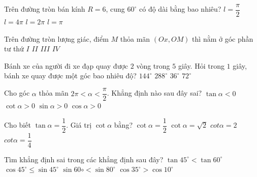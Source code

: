 \begin{ex}%
Trên đường tròn bán kính $R=6$, cung $60^\circ$  có độ dài bằng bao nhiêu?
	\choice
	{\True $l=\dfrac{\pi}{2}$}
	{$l=4\pi$}
	{$l=2\pi$}
	{$l=\pi$}
\end{ex}
\begin{ex}%
	Trên đường tròn lượng giác, điểm $M$ thỏa mãn $(Ox,OM)$ thì nằm ở góc phần tư thứ
	\choice
	{ $I$}
	{$II$}
	{$III$}
	{$IV$}
\end{ex}
\begin{ex}%
	Bánh xe của người đi xe đạp quay được $2$ vòng trong $5$ giây. Hỏi trong $1$ giây, bánh xe quay được một góc bao nhiêu độ?
	\choice
	{\True $144^\circ$}
	{$288^\circ$}
	{$36^\circ$}
	{$72^\circ$}
\end{ex}
\begin{ex}%
Cho góc $\alpha$ thỏa mãn $2\pi<\alpha<\dfrac{\pi}{2}$. Khẳng định nào sau đây sai?
	\choice
	{$\tan \alpha<0$}
	{$\cot \alpha>0$}
	{$\sin \alpha>0$}
	{$\cos \alpha>0$}
\end{ex}
\begin{ex}%
	Cho biết $\tan \alpha=\dfrac{1}{2}$. Giá trị $\cot \alpha$ bằng?
	\choice
	{$\cot \alpha=\dfrac{1}{2}$}
	{$\cot \alpha=\sqrt{2}$}
	{$cot \alpha=2$}
	{\True $cot \alpha=\dfrac{1}{4}$}
\end{ex}
\begin{ex}%
	Tìm khẳng định sai trong các khẳng định sau đây?
	\choice
	{$\tan 45^\circ<\tan 60^\circ$}
	{$\cos 45^\circ\leq \sin 45^\circ$}
	{\True $\sin 60\circ<\sin 80^\circ$}
	{$\cos 35^\circ>\cos 10^\circ$}
\end{ex}
